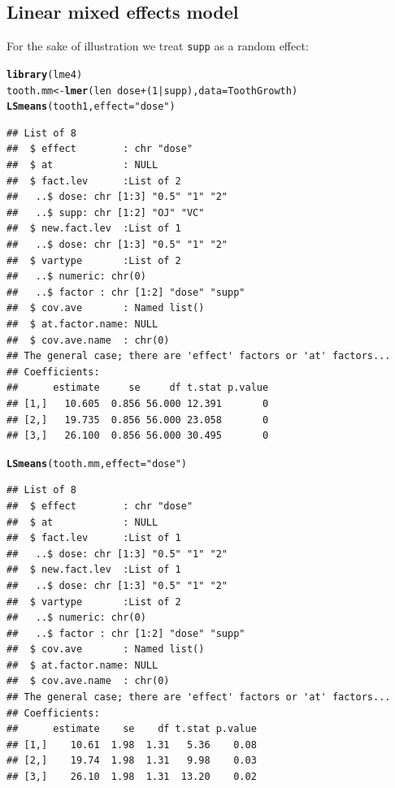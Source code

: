 \documentclass[10pt]{article}\usepackage[]{graphicx}\usepackage[]{color}
\makeatletter
\newcommand{\hlnum}[1]{\textcolor[rgb]{0.686,0.059,0.569}{#1}}%
\newcommand{\hlstr}[1]{\textcolor[rgb]{0.192,0.494,0.8}{#1}}%
\newcommand{\hlopt}[1]{\textcolor[rgb]{0,0,0}{#1}}%
\newcommand{\hlstd}[1]{\textcolor[rgb]{0.345,0.345,0.345}{#1}}%
\newcommand{\hlkwb}[1]{\textcolor[rgb]{0.69,0.353,0.396}{#1}}%
\newcommand{\hlkwc}[1]{\textcolor[rgb]{0.333,0.667,0.333}{#1}}%
\newcommand{\hlkwd}[1]{\textcolor[rgb]{0.737,0.353,0.396}{\textbf{#1}}}%
\newenvironment{kframe}{%
 \def\at@end@of@kframe{}%
 \ifinner\ifhmode%
  \def\at@end@of@kframe{\end{minipage}}%
  \begin{minipage}{\columnwidth}%
 \fi\fi%
 \def\FrameCommand##1{\hskip\@totalleftmargin \hskip-\fboxsep
 \colorbox{shadecolor}{##1}\hskip-\fboxsep
     \hskip-\linewidth \hskip-\@totalleftmargin \hskip\columnwidth}%
 \MakeFramed {\advance\hsize-\width
   \@totalleftmargin\z@ \linewidth\hsize
   \@setminipage}}%
 {\par\unskip\endMakeFramed%
 \at@end@of@kframe}
\newenvironment{knitrout}{}{} %
\makeatother
\begin{document}


\subsection{Linear mixed effects model}
\label{sec:linear-mixed-effects}


For the sake of illustration we treat \verb|supp| as a random effect:

\begin{knitrout}
\color{fgcolor}\begin{kframe}
\begin{alltt}
\hlkwd{library}\hlstd{(lme4)}
\hlstd{tooth.mm} \hlkwb{<-} \hlkwd{lmer}\hlstd{( len} \hlopt{~} \hlstd{dose}  \hlopt{+} \hlstd{(}\hlnum{1}\hlopt{|}\hlstd{supp),} \hlkwc{data}\hlstd{=ToothGrowth)}
\hlkwd{LSmeans}\hlstd{(tooth1,} \hlkwc{effect}\hlstd{=}\hlstr{"dose"}\hlstd{)}
\end{alltt}
\begin{verbatim}
## List of 8
##  $ effect        : chr "dose"
##  $ at            : NULL
##  $ fact.lev      :List of 2
##   ..$ dose: chr [1:3] "0.5" "1" "2"
##   ..$ supp: chr [1:2] "OJ" "VC"
##  $ new.fact.lev  :List of 1
##   ..$ dose: chr [1:3] "0.5" "1" "2"
##  $ vartype       :List of 2
##   ..$ numeric: chr(0) 
##   ..$ factor : chr [1:2] "dose" "supp"
##  $ cov.ave       : Named list()
##  $ at.factor.name: NULL
##  $ cov.ave.name  : chr(0) 
## The general case; there are 'effect' factors or 'at' factors...
## Coefficients:
##      estimate     se     df t.stat p.value
## [1,]   10.605  0.856 56.000 12.391       0
## [2,]   19.735  0.856 56.000 23.058       0
## [3,]   26.100  0.856 56.000 30.495       0
\end{verbatim}
\begin{alltt}
\hlkwd{LSmeans}\hlstd{(tooth.mm,} \hlkwc{effect}\hlstd{=}\hlstr{"dose"}\hlstd{)}
\end{alltt}
\begin{verbatim}
## List of 8
##  $ effect        : chr "dose"
##  $ at            : NULL
##  $ fact.lev      :List of 1
##   ..$ dose: chr [1:3] "0.5" "1" "2"
##  $ new.fact.lev  :List of 1
##   ..$ dose: chr [1:3] "0.5" "1" "2"
##  $ vartype       :List of 2
##   ..$ numeric: chr(0) 
##   ..$ factor : chr [1:2] "dose" "supp"
##  $ cov.ave       : Named list()
##  $ at.factor.name: NULL
##  $ cov.ave.name  : chr(0) 
## The general case; there are 'effect' factors or 'at' factors...
## Coefficients:
##      estimate    se    df t.stat p.value
## [1,]    10.61  1.98  1.31   5.36    0.08
## [2,]    19.74  1.98  1.31   9.98    0.03
## [3,]    26.10  1.98  1.31  13.20    0.02
\end{verbatim}
\end{kframe}
\end{knitrout}
\end{document}
